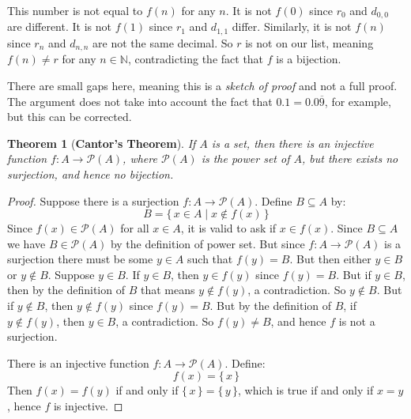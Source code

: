 \documentclass{article}
\theoremstyle{plain}
\newtheorem{theorem}{Theorem}[section]
\theoremstyle{normal}
\begin{document}
        This number is not equal to $f(n)$ for any $n$. It is not
        $f(0)$ since $r_{0}$ and $d_{0,0}$ are different. It is not
        $f(1)$ since $r_{1}$ and $d_{1,1}$ differ. Similarly, it is not
        $f(n)$ since $r_{n}$ and $d_{n,n}$ are not the same decimal. So
        $r$ is not on our list, meaning $f(n)\ne{r}$ for any $n\in\mathbb{N}$,
        contradicting the fact that $f$ is a bijection.
        \par\hfill\par
        There are small gaps here, meaning this is a \textit{sketch of proof}
        and not a full proof. The argument does not take into account the fact
        that $0.1=0.0\overline{9}$, for example, but this can be corrected.
        \begin{theorem}[\textbf{Cantor's Theorem}]
            If $A$ is a set, then there is an injective function
            $f:A\rightarrow\mathcal{P}(A)$, where $\mathcal{P}(A)$ is the power
            set of $A$, but there exists no surjection, and hence no bijection.
        \end{theorem}
        \begin{proof}
            Suppose there is a surjection $f:A\rightarrow\mathcal{P}(A)$.
            Define $B\subseteq{A}$ by:
            \begin{equation}
                B=\{\,x\in{A}\;|\;x\notin{f}(x)\,\}
            \end{equation}
            Since $f(x)\in\mathcal{P}(A)$ for all $x\in{A}$, it is valid to ask
            if $x\in{f}(x)$. Since $B\subseteq{A}$ we have $B\in\mathcal{P}(A)$
            by the definition of power set. But since
            $f:A\rightarrow\mathcal{P}(A)$ is a surjection there must be some
            $y\in{A}$ such that $f(y)=B$. But then either $y\in{B}$ or
            $y\notin{B}$. Suppose $y\in{B}$. If $y\in{B}$, then $y\in{f}(y)$
            since $f(y)=B$. But if $y\in{B}$, then by the definition of $B$
            that means $y\notin{f}(y)$, a contradiction. So $y\notin{B}$. But
            if $y\notin{B}$, then $y\notin{f}(y)$ since $f(y)=B$. But by
            the definition of $B$, if $y\notin{f}(y)$, then $y\in{B}$, a
            contradiction. So $f(y)\ne{B}$, and hence $f$ is not a surjection.
            \par\hfill\par
            There is an injective function $f:A\rightarrow\mathcal{P}(A)$.
            Define:
            \begin{equation}
                f(x)=\{\,x\,\}
            \end{equation}
            Then $f(x)=f(y)$ if and only if $\{\,x\,\}=\{\,y\,\}$, which is
            true if and only if $x=y$, hence $f$ is injective.
        \end{proof}
\end{document}
